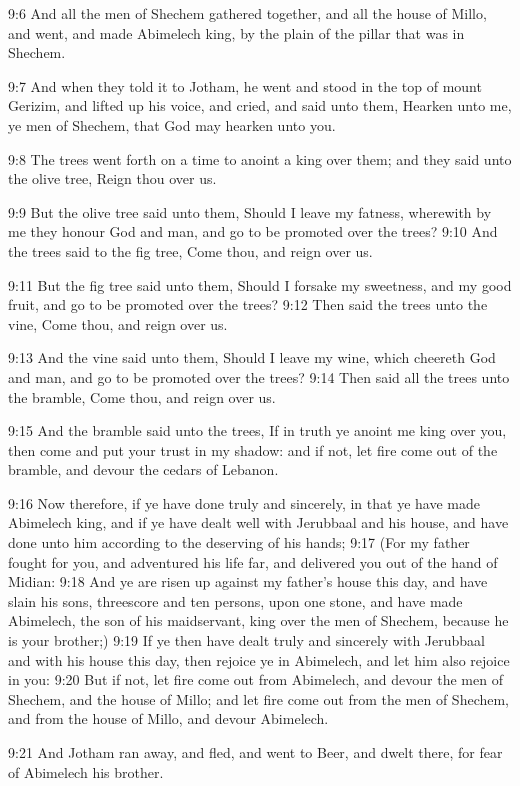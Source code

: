 9:6 And all the men of Shechem gathered together, and all the house of
Millo, and went, and made Abimelech king, by the plain of the pillar
that was in Shechem.

9:7 And when they told it to Jotham, he went and stood in the top of
mount Gerizim, and lifted up his voice, and cried, and said unto them,
Hearken unto me, ye men of Shechem, that God may hearken unto you.

9:8 The trees went forth on a time to anoint a king over them; and
they said unto the olive tree, Reign thou over us.

9:9 But the olive tree said unto them, Should I leave my fatness,
wherewith by me they honour God and man, and go to be promoted over
the trees?  9:10 And the trees said to the fig tree, Come thou, and
reign over us.

9:11 But the fig tree said unto them, Should I forsake my sweetness,
and my good fruit, and go to be promoted over the trees?  9:12 Then
said the trees unto the vine, Come thou, and reign over us.

9:13 And the vine said unto them, Should I leave my wine, which
cheereth God and man, and go to be promoted over the trees?  9:14 Then
said all the trees unto the bramble, Come thou, and reign over us.

9:15 And the bramble said unto the trees, If in truth ye anoint me
king over you, then come and put your trust in my shadow: and if not,
let fire come out of the bramble, and devour the cedars of Lebanon.

9:16 Now therefore, if ye have done truly and sincerely, in that ye
have made Abimelech king, and if ye have dealt well with Jerubbaal and
his house, and have done unto him according to the deserving of his
hands; 9:17 (For my father fought for you, and adventured his life
far, and delivered you out of the hand of Midian: 9:18 And ye are
risen up against my father's house this day, and have slain his sons,
threescore and ten persons, upon one stone, and have made Abimelech,
the son of his maidservant, king over the men of Shechem, because he
is your brother;) 9:19 If ye then have dealt truly and sincerely with
Jerubbaal and with his house this day, then rejoice ye in Abimelech,
and let him also rejoice in you: 9:20 But if not, let fire come out
from Abimelech, and devour the men of Shechem, and the house of Millo;
and let fire come out from the men of Shechem, and from the house of
Millo, and devour Abimelech.

9:21 And Jotham ran away, and fled, and went to Beer, and dwelt there,
for fear of Abimelech his brother.

